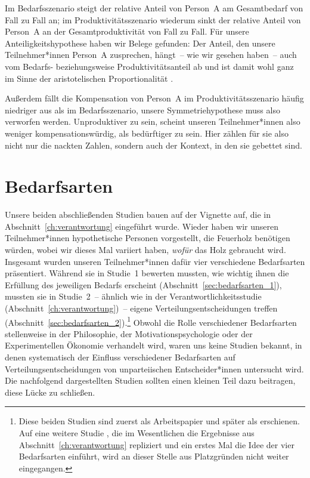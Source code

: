 \documentclass[justified,nobib,nohyper,symmetric,twoside]{tufte-book}
\begin{document}
Im Bedarfsszenario steigt der relative Anteil von Person~A am Gesamtbedarf von Fall zu Fall an; im Produktivitätsszenario wiederum sinkt der relative Anteil von Person~A an der Gesamtproduktivität von Fall zu Fall. Für unsere Anteiligkeitshypothese haben wir Belege gefunden: Der Anteil, den unsere Teilnehmer*innen Person~A zusprechen, hängt~-- wie wir gesehen haben~-- auch vom Bedarfs- beziehungsweise Produktivitätsanteil ab und ist damit wohl ganz im Sinne der aristotelischen Proportionalität \citep[S.~167--172, 1131\,a--1132\,b]{aristoteles_nikomachische_2006}.

Außerdem fällt die Kompensation von Person~A im Produktivitätsszenario häufig niedriger aus als im Bedarfsszenario, unsere Symmetriehypothese muss also verworfen werden.
Unproduktiver zu sein, scheint unseren Teilnehmer*innen also weniger kompensationswürdig, als bedürftiger zu sein.
Hier zählen für sie also nicht nur die nackten Zahlen, sondern auch der Kontext, in den sie gebettet sind.


\chapter{Bedarfsarten}\label{ch:bedarfsarten}
Unsere beiden abschließenden Studien bauen auf der Vignette auf, die in Abschnitt~\ref{ch:verantwortung} eingeführt wurde.
Wieder haben wir unseren Teilnehmer*innen hypothetische Personen vorgestellt, die Feuerholz benötigen würden, wobei wir dieses Mal variiert haben, \textit{wofür} das Holz gebraucht wird.
Insgesamt wurden unseren Teilnehmer*innen dafür vier verschiedene Bedarfsarten präsentiert.
Während sie in Studie~1 bewerten mussten, wie wichtig ihnen die Erfüllung des jeweiligen Bedarfs erscheint (Abschnitt~\ref{sec:bedarfsarten_1}), mussten sie in Studie~2~-- ähnlich wie in der Verantwortlichkeitsstudie (Abschnitt~\ref{ch:verantwortung})~-- eigene Verteilungsentscheidungen treffen (Abschnitt~\ref{sec:bedarfsarten_2}).\footnote{Diese beiden Studien sind zuerst als Arbeitspapier \citep{bauer_kinds_2023} und später als \citet{bauer_winter_2023} erschienen. Auf eine weitere Studie \citep{bauer_deeds_nd}, die im Wesentlichen die Ergebnisse aus Abschnitt~\ref{ch:verantwortung} repliziert und ein erstes Mal die Idee der vier Bedarfsarten einführt, wird an dieser Stelle aus Platzgründen nicht weiter eingegangen.}
Obwohl die Rolle verschiedener Bedarfsarten stellenweise in der Philosophie, der Motivationspsychologie oder der Experimentellen Ökonomie verhandelt wird, waren uns keine Studien bekannt, in denen systematisch der Einfluss verschiedener Bedarfsarten auf Verteilungsentscheidungen von unparteiischen Entscheider*innen untersucht wird.
Die nachfolgend dargestellten Studien sollten einen kleinen Teil dazu beitragen, diese Lücke zu schließen.
\end{document}
